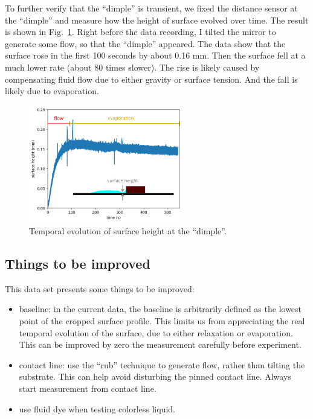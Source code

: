 \documentclass[12pt]{article}
\begin{document}
To further verify that the ``dimple'' is transient, we fixed the distance sensor at the ``dimple'' and measure how the height of surface evolved over time. The result is shown in Fig.~\ref{fig:fixed_point_long_time}. Right before the data recording, I tilted the mirror to generate some flow, so that the ``dimple'' appeared. The data show that the surface rose in the first 100 seconds by about 0.16 mm. Then the surface fell at a much lower rate (about 80 times slower). The rise is likely caused by compensating fluid flow due to either gravity or surface tension. And the fall is likely due to evaporation.

\begin{figure}
    \centering
    \includegraphics[width=0.6\textwidth]{Figures/fixed_point_long_time.pdf}
    \caption{Temporal evolution of surface height at the ``dimple''.}
    \label{fig:fixed_point_long_time}
\end{figure}

\subsection{Things to be improved}

This data set presents some things to be improved:

\begin{itemize}
    \item baseline: in the current data, the baseline is arbitrarily defined as the lowest point of the cropped surface profile. This limits us from appreciating the real temporal evolution of the surface, due to either relaxation or evaporation. This can be improved by zero the measurement carefully before experiment.
    \item contact line: use the ``rub'' technique to generate flow, rather than tilting the substrate. This can help avoid disturbing the pinned contact line. Always start measurement from contact line.
    \item use fluid dye when testing colorless liquid.
\end{itemize}
\end{document}
